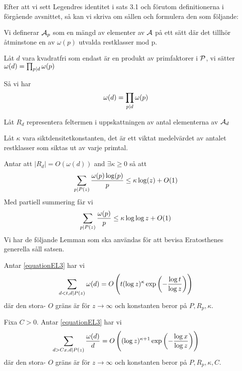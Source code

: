 Efter att vi sett Legendres identitet i sats 3.1 och förutom definitionerna i förgående avsnittet, så kan vi skriva om sållen och formulera den som följande:

Vi definerar $\A_{p}$ som en mängd av elementer av $ \A $ på ett sätt där det tillhör åtminstone en av $\omega(p)$ utvalda restklasser mod p.

Låt $ d $ vara kvadratfri som endast är en produkt av primfaktorer i $ \P $, vi sätter $\omega(d)=\prod_{p \divides d} \omega(p)$

Så vi har
\[\omega(d)=\prod_{p\divides d}\omega(p)\]

Låt $ R_{d} $ representera feltermen i uppskattningen av antal elementerna av $ \A_{d} $ 


Låt $ \kappa $ vara siktdensitetkonstanten, det är ett viktat medelvärdet av antalet restklasser som siktas ut av varje primtal.


Antar att $ \vert R_{d}\vert=O(\omega(d))$ and $ \exists\kappa\geq 0 $ så att
\begin{equation}
\label{equationEL3}
\sum_{p\divides P(z)}\frac{\omega(p)\log(p)}{p}\leq \kappa \log(z)+O(1)
\end{equation}  
Med partiell summering får vi
\[\sum_{p\divides P(z)}\frac{\omega(p)}{p}\leq\kappa\log\log z+O(1)\]
   Vi har de följande Lemman som ska användas för att bevisa Eratosthenes generella såll satsen.
\begin{lemma}
     Antar \ref{equationEL3} har vi
$$
\sum_{d<t, d \divides P(z)} \omega(d)=O\left(t(\log z)^{\kappa} \exp \left(-\frac{\log t}{\log z}\right)\right)
$$
där den stora- $O$ gräns är för $z \rightarrow \infty$ och konstanten beror på $P, R_{p}, \kappa$.
\end{lemma}
\begin{lemma}
    Fixa $C>0 .$ Antar \ref{equationEL3} har vi
$$
\sum_{d>C x, d \divides P(z)} \frac{\omega(d)}{d}=O\left((\log z)^{\kappa+1} \exp \left(-\frac{\log x}{\log z}\right)\right)
$$
där den stora- $O$ gräns är för $z \rightarrow \infty$ och konstanten beror på $P, R_{p}, \kappa, C .$
 
\end{lemma}

